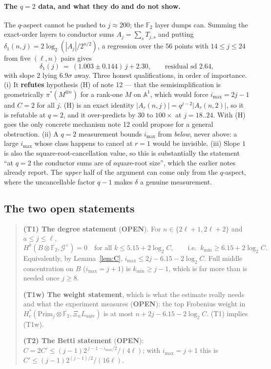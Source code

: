 \documentclass[10pt]{article}
\theoremstyle{plain}
\theoremstyle{definition}
\newcommand{\F}{\mathbb F}
\newcommand{\Prim}{\mathrm{Prim}}
\newcommand{\Luniv}{L_{\mathrm{univ}}}
\newcommand{\imax}{i_{\max}}
\newcommand{\kmin}{k_{\min}}
\newcommand{\openstatus}{\textcolor{open}{\textsf{\textbf{\footnotesize OPEN}}}}
\begin{document}
\paragraph{The $q=2$ data, and what they do and do not show.} The $q$-aspect
cannot be pushed to $j\approx200$; the $\F_2$ layer dumps can. Summing the
exact-order layers to conductor sums $A_j=\sum_sT_{j,s}$ and putting
$\delta_1(n,j)=2\log_2(|A_j|/2^{n/2})$, a regression over the $56$ points with
$14\le j\le24$ from five $(\ell,n)$ pairs gives
\[
 \delta_1(j)\ =\ (1.003\pm0.144)\,j+2.30,\qquad\text{residual sd }2.64 ,
\]
with slope $2$ lying $6.9\sigma$ away. Three honest qualifications, in order of
importance. (i) It \textbf{refutes} hypothesis (H) of note 12 --- that the
semisimplification is geometrically $\pi^*(M^{\otimes n})$ for a rank-one $M$ on
$\mathbb A^1$, which would force $\imax=2j-1$ and $C=2$ for all $j$. (H) is an
exact identity $|A_r(n,j)|=q^{j-2}|A_r(n,2)|$, so it is refutable at $q=2$, and
it over-predicts by $30$ to $100\times$ at $j=18..24$. With (H) goes the only
concrete mechanism note 12 could propose for a general obstruction.
(ii) A $q=2$ measurement bounds $\imax$ from \emph{below}, never above: a large
$\imax$ whose class happens to cancel at $r=1$ would be invisible.
(iii) Slope $1$ is also the square-root-cancellation value, so this is
substantially the statement ``at $q=2$ the conductor sums are of square-root
size'', which the earlier notes already report. The \emph{upper} half of the
argument can come only from the $q$-aspect, where the uncancellable factor
$q-1$ makes $\delta$ a genuine measurement.

\subsection{The two open statements}

\begin{quote}
\textbf{(T1) The degree statement} (\openstatus). For $n\in\{2\ell+1,2\ell+2\}$
and $a\le j\le\ell$,
\[
 H^k(B\otimes\overline{\F_2},\mathcal G^{\vee})=0
 \quad\text{for all }k\le5.15+2\log_2C,
 \qquad\text{i.e. }\ \kmin\ge6.15+2\log_2C .
\]
Equivalently, by Lemma~\ref{lem:C}, $\imax\le2j-6.15-2\log_2C$. Full middle
concentration on $B$ ($\imax=j+1$) is $\kmin\ge j-1$, which is far more than is
needed once $j\ge8$.

\smallskip
\textbf{(T1w) The weight statement}, which is what the estimate really needs
and what the experiment measures (\openstatus): the top Frobenius weight in
$H^*_c(\Prim_j\otimes\overline{\F_2},\Xi_n\Luniv)$ is at most
$n+2j-6.15-2\log_2C$. (T1) implies (T1w).

\smallskip
\textbf{(T2) The Betti statement} (\openstatus):
$C=2C'\le(j-1)2^{\,j-1-\imax/2}/(4\ell)$; with $\imax=j+1$ this is
$C'\le(j-1)2^{(j-1)/2}/(16\ell)$.
\end{quote}
\end{document}
